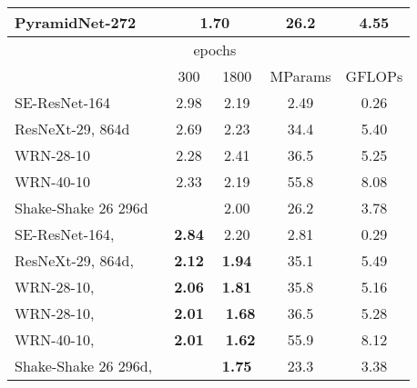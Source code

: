 \documentclass[lettersize,journal]{IEEEtran}
\begin{document}
\begin{table}[!t]
{\begin{threeparttable}
\begin{tabular}{lcccc}
PyramidNet-272~\cite{2017_PyramidNet,2019_shakedrop,2019_fastAA}
				& \multicolumn{2}{c}{1.70}
& 26.2	
				& 4.55			\\
				\midrule
				\rowcolor{Gray}
				
				~
				& \multicolumn{2}{c}{epochs}
				&
				& \\	
				
				
				\rowcolor{Gray}
				\multirow{-2}{*}{\centering re-implementation}
				& 300
				& 1800	
				& \multirow{-2}{*}{\centering MParams}
				& \multirow{-2}{*}{\centering GFLOPs}			\\
				\midrule
				
				SE-ResNet-164
				& 2.98
				& 2.19
				& 2.49					
				& 0.26			\\
				
				ResNeXt-29, 864d
				& 2.69
				& 2.23
				& 34.4	
				& 5.40			\\
				
				
				WRN-28-10
				& 2.28
				& 2.41
				& 36.5	
				& 5.25			\\
				
				WRN-40-10
				& 2.33
				& 2.19
				& 55.8	
				& 8.08			\\
				
				Shake-Shake 26 296d
				& 
				& 2.00
				& 26.2	
				& 3.78			\\
				


				\midrule
				
				SE-ResNet-164,~
				& \textbf{2.84}
				& 2.20
				& 2.81					
				& 0.29			\\
				
				ResNeXt-29, 864d,~ 
				& \textbf{2.12}
				& \textbf{1.94}
				& 35.1	
				& 5.49			\\	
				
				WRN-28-10,~ 
				& \textbf{2.06}
				& \textbf{1.81}
				& 35.8	
				& 5.16			\\	
				
				WRN-28-10,~ 
				& \textbf{2.01}
				& ~\textbf{1.68}
				& 36.5	
				& 5.28			\\
				


				WRN-40-10,~
				& \textbf{2.01}
				& ~\textbf{1.62}
				& 55.9	
				& 8.12			\\
				
				Shake-Shake 26 296d,~
				& 
				& \textbf{1.75}
				& 23.3	
				& 3.38			\\	
				

\end{tabular}
\end{threeparttable}}
\end{table}
\end{document}
